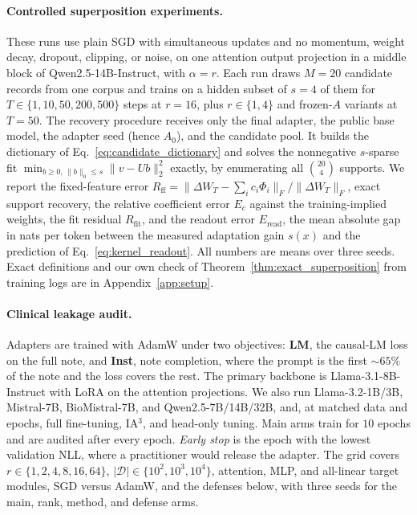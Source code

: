 \documentclass[11pt]{article}
\newcommand{\D}{\mathcal{D}}
\theoremstyle{plain}
\theoremstyle{definition}
\begin{document}
\paragraph{Controlled superposition experiments.}
These runs use plain SGD with simultaneous updates and no momentum, weight decay, dropout, clipping, or noise, on one attention output projection in a middle block of Qwen2.5-14B-Instruct, with $\alpha=r$.
Each run draws $M{=}20$ candidate records from one corpus and trains on a hidden subset of $s{=}4$ of them for $T\in\{1,10,50,200,500\}$ steps at $r{=}16$, plus $r\in\{1,4\}$ and frozen-$A$ variants at $T{=}50$.
The recovery procedure receives only the final adapter, the public base model, the adapter seed (hence $A_0$), and the candidate pool.
It builds the dictionary of Eq.~\eqref{eq:candidate_dictionary} and solves the nonnegative $s$-sparse fit $\min_{b\geq0,\,\|b\|_0\leq s}\|v-Ub\|_2^2$ exactly, by enumerating all $\binom{20}{4}$ supports.
We report the fixed-feature error $R_{\mathrm{ff}}=\|\Delta W_T-\sum_ic_i\Phi_i\|_F/\|\Delta W_T\|_F$, exact support recovery, the relative coefficient error $E_c$ against the training-implied weights, the fit residual $R_{\mathrm{fit}}$, and the readout error $E_{\mathrm{read}}$, the mean absolute gap in nats per token between the measured adaptation gain $s(x)$ and the prediction of Eq.~\eqref{eq:kernel_readout}.
All numbers are means over three seeds. Exact definitions and our own check of Theorem~\ref{thm:exact_superposition} from training logs are in Appendix~\ref{app:setup}.

\paragraph{Clinical leakage audit.}
Adapters are trained with AdamW under two objectives: \textbf{LM}, the causal-LM loss on the full note, and \textbf{Inst}, note completion, where the prompt is the first ${\sim}65\%$ of the note and the loss covers the rest.
The primary backbone is Llama-3.1-8B-Instruct with LoRA on the attention projections.
We also run Llama-3.2-1B/3B, Mistral-7B, BioMistral-7B, and Qwen2.5-7B/14B/32B, and, at matched data and epochs, full fine-tuning, IA$^3$, and head-only tuning.
Main arms train for $10$ epochs and are audited after every epoch. \emph{Early stop} is the epoch with the lowest validation NLL, where a practitioner would release the adapter.
The grid covers $r\in\{1,2,4,8,16,64\}$, $|\D|\in\{10^2,10^3,10^4\}$, attention, MLP, and all-linear target modules, SGD versus AdamW, and the defenses below, with three seeds for the main, rank, method, and defense arms.
\end{document}
